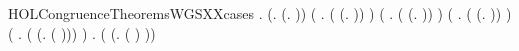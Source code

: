 \begin{SaveVerbatim}{HOLCongruenceTheoremsWGSXXcases}
\HOLTokenTurnstile{} \HOLSymConst{\HOLTokenForall{}}.
         \HOLSymConst{\HOLTokenEquiv{}}
       (\HOLSymConst{\HOLTokenExists{}}.  \HOLSymConst{=} (\HOLTokenLambda{}. )) \HOLSymConst{\HOLTokenDisj{}}
       (\HOLSymConst{\HOLTokenExists{}} . ( \HOLSymConst{=} (\HOLTokenLambda{}.  )) \HOLSymConst{\HOLTokenConj{}}  ) \HOLSymConst{\HOLTokenDisj{}}
       (\HOLSymConst{\HOLTokenExists{}}   .
            ( \HOLSymConst{=} (\HOLTokenLambda{}.   \HOLSymConst{+}  )) \HOLSymConst{\HOLTokenConj{}}   \HOLSymConst{\HOLTokenConj{}}
             ) \HOLSymConst{\HOLTokenDisj{}}
       (\HOLSymConst{\HOLTokenExists{}} . ( \HOLSymConst{=} (\HOLTokenLambda{}.   \HOLSymConst{\ensuremath{\parallel}}  )) \HOLSymConst{\HOLTokenConj{}}   \HOLSymConst{\HOLTokenConj{}}  ) \HOLSymConst{\HOLTokenDisj{}}
       (\HOLSymConst{\HOLTokenExists{}} . ( \HOLSymConst{=} (\HOLTokenLambda{}. \HOLConst{\ensuremath{\nu}}  ( ))) \HOLSymConst{\HOLTokenConj{}}  ) \HOLSymConst{\HOLTokenDisj{}}
       \HOLSymConst{\HOLTokenExists{}} . ( \HOLSymConst{=} (\HOLTokenLambda{}.  ( ) )) \HOLSymConst{\HOLTokenConj{}}  
\end{SaveVerbatim}
